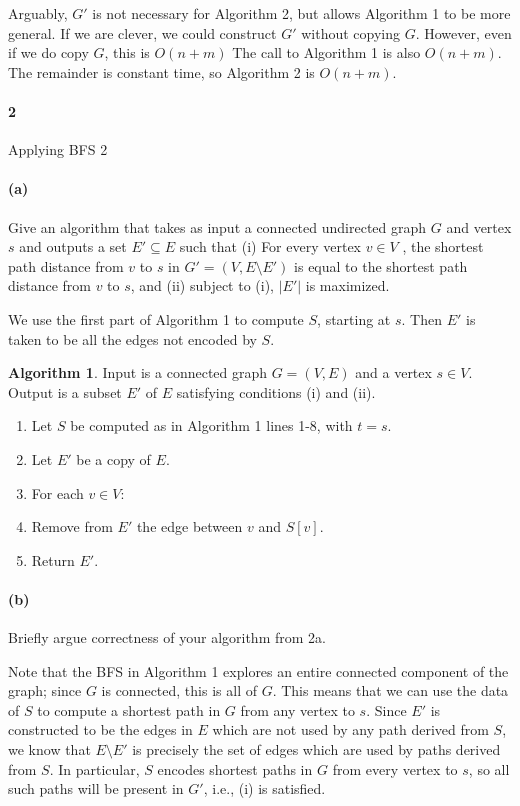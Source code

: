\documentclass[12pt]{article}
\newlength{\myparskip}
\newenvironment{fullbox}{\begin{lrbox}{\savefullbox}\begin{minipage}{\dimexpr\textwidth-2\fboxsep\relax}\setlength{\parskip}{\myparskip}}{\end{minipage}\end{lrbox}\framebox[\textwidth]{\usebox{\savefullbox}}}
\newenvironment{pbox}[1][]{\begin{fullbox}\def\temp{#1}\ifx\temp\empty\else\paragraph{#1}\phantom{}\fi}{\end{fullbox}}
\theoremstyle{definition}
\newtheorem{algorithm}{Algorithm}
\newcommand{\<}{\langle}
\renewcommand{\>}{\rangle}
\newcommand{\seq}{\subseteq}
\newcommand{\tab}{\hspace{1cm}}
\begin{document}
Arguably, $G'$ is not necessary for Algorithm 2, but allows Algorithm 1 to be more general.
If we are clever, we could construct $G'$ without copying $G$.
However, even if we do copy $G$, this is $O(n + m)$
The call to Algorithm 1 is also $O(n + m)$.
The remainder is constant time, so Algorithm 2 is $O(n + m)$.


\newpage
\begin{pbox}[2]
    Applying BFS 2
\end{pbox}

\begin{pbox}[(a)]
    Give an algorithm that takes as input a connected undirected graph $G$ and vertex $s$ and outputs a set $E' \seq E$ such that (i) For every vertex $v \in V$ , the shortest path distance from $v$ to $s$ in $G' = (V, E \setminus E')$ is equal to the shortest path distance from $v$ to $s$, and (ii) subject to (i), $|E'|$ is maximized.
\end{pbox}

We use the first part of Algorithm 1 to compute $S$, starting at $s$.
Then $E'$ is taken to be all the edges not encoded by $S$.

\begin{algorithm}
    Input is a connected graph $G = (V, E)$ and a vertex $s \in V$.
    Output is a subset $E'$ of $E$ satisfying conditions (i) and (ii).

    \begin{enumerate}
        \item Let $S$ be computed as in Algorithm 1 lines 1-8, with $t = s$.
        \item Let $E'$ be a copy of $E$.
        \item For each $v \in V$:
        \item \tab Remove from $E'$ the edge between $v$ and $S[v]$.
        \item Return $E'$.
    \end{enumerate}
\end{algorithm}




\begin{pbox}[(b)]
    Briefly argue correctness of your algorithm from 2a.
\end{pbox}

Note that the BFS in Algorithm 1 explores an entire connected component of the graph; since $G$ is connected, this is all of $G$.
This means that we can use the data of $S$ to compute a shortest path in $G$ from any vertex to $s$.
Since $E'$ is constructed to be the edges in $E$ which are not used by any path derived from $S$, we know that $E \setminus E'$ is precisely the set of edges which are used by paths derived from $S$.
In particular, $S$ encodes shortest paths in $G$ from every vertex to $s$, so all such paths will be present in $G'$, i.e., (i) is satisfied.
\end{document}

